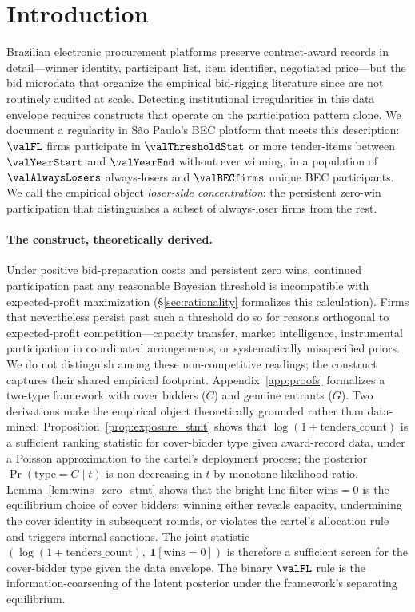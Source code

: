
\section{Introduction}
\label{sec:intro}

Brazilian electronic procurement platforms preserve contract-award
records in detail---winner identity, participant list, item identifier,
negotiated price---but the bid microdata that organize the empirical
bid-rigging literature since \citet{porter1993detection} are not
routinely audited at scale. Detecting institutional irregularities in
this data envelope requires constructs that operate on the
participation pattern alone. We document a regularity in São Paulo's
BEC platform that meets this description: $\valFL$ firms participate
in $\valThresholdStat$ or more tender-items between $\valYearStart$ and
$\valYearEnd$ without ever winning, in a population of
$\valAlwaysLosers$ always-losers and $\valBECfirms$ unique BEC
participants. We call the empirical object \emph{loser-side
concentration}: the persistent zero-win participation that
distinguishes a subset of always-loser firms from the rest.

\paragraph{The construct, theoretically derived.}
Under positive bid-preparation costs and persistent zero wins,
continued participation past any reasonable Bayesian threshold is
incompatible with expected-profit maximization
(\S\ref{sec:rationality} formalizes this calculation). Firms that
nevertheless persist past such a threshold do so for reasons
orthogonal to expected-profit competition---capacity transfer,
market intelligence, instrumental participation in coordinated
arrangements, or systematically misspecified priors. We do not
distinguish among these non-competitive readings; the construct
captures their shared empirical footprint. Appendix~\ref{app:proofs}
formalizes a two-type framework with cover bidders ($C$) and genuine
entrants ($G$). Two derivations make the empirical object
theoretically grounded rather than data-mined:
Proposition~\ref{prop:exposure_stmt} shows that
$\log(1{+}\text{tenders\_count})$ is a sufficient ranking statistic
for cover-bidder type given award-record data, under a Poisson
approximation to the cartel's deployment process; the posterior
$\Pr(\text{type}=C \mid t)$ is non-decreasing in $t$ by monotone
likelihood ratio. Lemma~\ref{lem:wins_zero_stmt} shows that the
bright-line filter $\text{wins}=0$ is the equilibrium choice of cover
bidders: winning either reveals capacity, undermining the cover
identity in subsequent rounds, or violates the cartel's allocation
rule and triggers internal sanctions. The joint statistic
$(\log(1{+}\text{tenders\_count}),\ \mathbf{1}[\text{wins}=0])$ is
therefore a sufficient screen for the cover-bidder type given the
data envelope. The binary $\valFL$ rule is the
information-coarsening of the latent posterior under the framework's
separating equilibrium.


